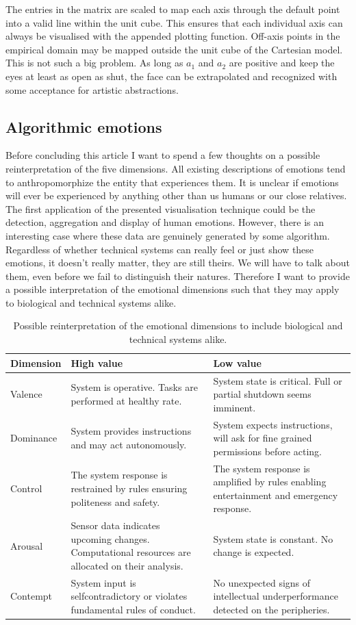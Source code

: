The entries in the matrix are scaled to map each axis through the default point into a valid line within the unit cube.
This ensures that each individual axis can always be visualised with the appended plotting function.
Off-axis points in the empirical domain may be mapped outside the unit cube of the Cartesian model.
This is not such a big problem. As long as $a_1$ and $a_2$ are positive and keep the eyes at least as open as shut,
the face can be extrapolated and
recognized with some acceptance for artistic abstractions.

\subsection{Algorithmic emotions}

Before concluding this article I want to spend a few thoughts on a possible reinterpretation of the five dimensions.
All existing descriptions of emotions tend to anthropomorphize the entity that experiences them.
It is unclear if emotions will ever be experienced by anything other than us humans or our close relatives.
The first application of the presented visualisation technique could be the detection, aggregation and display of human emotions.
However, there is an interesting case where these data are genuinely generated by some algorithm.
Regardless of whether technical systems can really feel or just show these emotions, it doesn’t really matter, they are still theirs.
We will have to talk about them, even before we fail to distinguish their natures.
Therefore I want to provide a possible interpretation of the emotional dimensions such that they may apply to biological and technical systems alike.

\begin{table}[ht!]
  \begin{center}
    \begin{tabularx}{\textwidth}{lXX}
Dimension
&
High value
&
Low value
\\
\midrule
Valence
&
System is operative.
Tasks are performed at healthy rate.
&
System state is critical.
Full or partial shutdown seems imminent.
\\
Dominance
&
System provides instructions
and may act autonomously.
&
System expects instructions,
will ask for fine grained permissions before
acting.
\\
Control
&
The system response is restrained by rules
ensuring politeness and safety.
&
The system response is amplified by rules
enabling entertainment and emergency response.
\\
Arousal
&
Sensor data indicates upcoming changes.
Computational resources are allocated on their analysis.
&
System state is constant.
No change is expected.
\\
Contempt
&
System input is selfcontradictory or
violates fundamental rules of conduct.
&
No unexpected signs of intellectual underperformance
detected on the peripheries.
\\
\midrule
    \end{tabularx}
  \end{center}
  \caption{Possible reinterpretation of the emotional dimensions to include biological and technical systems alike.}
\end{table}


